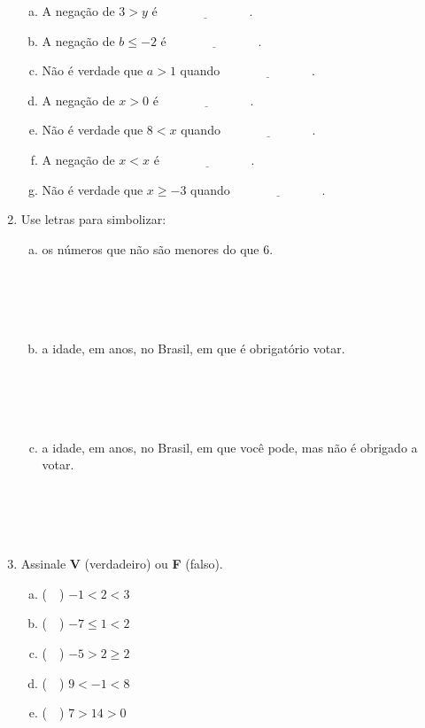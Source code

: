 \documentclass[a4paper,14pt]{article}
\begin{document}
\begin{multicols}{2}
\begin{enumerate}
\begin{enumerate}[a)]
				\item A negação de $3 > y$ é $\underline{~~~~~~~~~~~~~~~~~~~~~~~~~~~~~~~~}$.
				\item A negação de $b \leq -2$ é $\underline{~~~~~~~~~~~~~~~~~~~~~~~~~~~~~~~~}$.
				\item Não é verdade que $a > 1$ quando $\underline{~~~~~~~~~~~~~~~~~~~~~~~~~~~~~~~~}$.
				\item A negação de $x > 0$ é $\underline{~~~~~~~~~~~~~~~~~~~~~~~~~~~~~~~~}$.
				\item Não é verdade que $8 < x$ quando $\underline{~~~~~~~~~~~~~~~~~~~~~~~~~~~~~~~~}$.
				\item A negação de $x < x$ é $\underline{~~~~~~~~~~~~~~~~~~~~~~~~~~~~~~~~}$.
				\item Não é verdade que $x \geq -3$ quando $\underline{~~~~~~~~~~~~~~~~~~~~~~~~~~~~~~~~}$.
			\end{enumerate}
			\item Use letras para simbolizar:
			\begin{enumerate}[a)]
				\item os números que não são menores do que 6. \\\\\\\\\\
				\item a idade, em anos, no Brasil, em que é obrigatório votar. \\\\\\\\\\
				\item a idade, em anos, no Brasil, em que você pode, mas não é obrigado a votar. \\\\\\\\\\
			\end{enumerate}
			\item Assinale \textbf{V} (verdadeiro) ou \textbf{F} (falso).
			\begin{enumerate}[a)]
				\item (~~) $-1 < 2 < 3$
				\item (~~) $-7 \leq 1 < 2$
				\item (~~) $-5 > 2 \geq 2$
				\item (~~) $9 < -1 < 8$
				\item (~~) $7 > 14 > 0$

\end{enumerate}
\end{enumerate}
\end{multicols}
\end{document}
